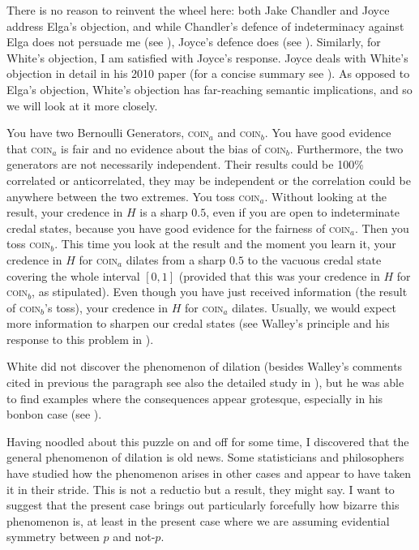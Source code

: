 There is no reason to reinvent the wheel here: both Jake Chandler and Joyce address Elga's objection, and while Chandler's defence of indeterminacy against Elga does not persuade me (see ), Joyce's defence does (see ). Similarly, for White's objection, I am satisfied with Joyce's response. Joyce deals with White's objection in detail in his 2010 paper (for a concise summary see ). As opposed to Elga's objection, White's objection has far-reaching semantic implications, and so we will look at it more closely.

You have two Bernoulli Generators, \textsc{coin}$_{a}$ and \textsc{coin}$_{b}$. You have good evidence that \textsc{coin}$_{a}$ is fair and no evidence about the bias of \textsc{coin}$_{b}$. Furthermore, the two generators are not necessarily independent. Their results could be 100\% correlated or anticorrelated, they may be independent or the correlation could be anywhere between the two extremes. You toss \textsc{coin}$_{a}$. Without looking at the result, your credence in $H$ is a sharp $0.5$, even if you are open to indeterminate credal states, because you have good evidence for the fairness of \textsc{coin}$_{a}$. Then you toss \textsc{coin}$_{b}$. This time you look at the result and the moment you learn it, your credence in $H$ for \textsc{coin}$_{a}$ dilates from a sharp $0.5$ to the vacuous credal state covering the whole interval $[0,1]$ (provided that this was your credence in $H$ for \textsc{coin}$_{b}$, as stipulated). Even though you have just received information (the result of \textsc{coin}$_{b}$'s toss), your credence in $H$ for \textsc{coin}$_{a}$ dilates. Usually, we would expect more information to sharpen our credal states (see Walley's  principle and his response to this problem in ).

White did not discover the phenomenon of dilation (besides Walley's comments cited in previous the paragraph see also the detailed study in ), but he was able to find examples where the consequences appear grotesque, especially in his bonbon case (see ).

\begin{quotex}
  Having noodled about this puzzle on and off for some time, I discovered that the general phenomenon of dilation is old news. Some statisticians and philosophers have studied how the phenomenon arises in other cases and appear to have taken it in their stride. This is not a reductio but a result, they might say. I want to suggest that the present case brings out particularly forcefully how bizarre this phenomenon is, at least in the present case where we are assuming evidential symmetry between $p$ and not-$p$. 
\end{quotex}


